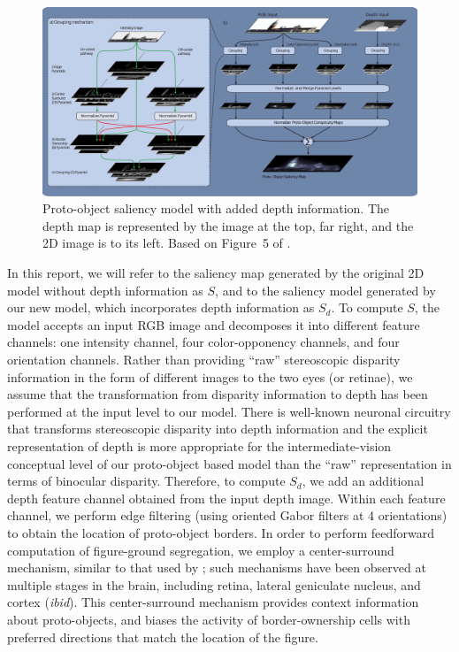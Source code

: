 \documentclass[12pt]{article}
\newcommand{\eg}[0]{{\em e.g.}\xspace}
\newcommand{\ibid}[0]{{\em ibid}\xspace}
\begin{document}
\begin{figure}%
\hfill
\begin{center}
\includegraphics[width=6in]{figs/DepthSaliency_new1.eps}
\end{center}
\caption{Proto-object saliency model with added depth information. The
  depth map is represented by the image at the top, far right, and the
  2D image is to its left. Based on Figure~5 of \cite{Russell_etal14}.}
\label{Fig:Model}
\end{figure}

In this report, we will refer to the saliency map generated by the
original 2D model without depth information as $S$, and to the
saliency model generated by our new model, which incorporates depth
information as $S_d$. To compute $S$, the model accepts an input RGB
image and decomposes it into different feature channels: one intensity
channel, four color-opponency channels, and four orientation channels.
Rather than providing ``raw'' stereoscopic disparity information in
the form of different images to the two eyes (or retinae), we assume
that the transformation from disparity information to depth has been
performed at the input level to our model. There is well-known
neuronal circuitry that transforms stereoscopic disparity into depth
information \cite[\eg][]{Poggio_Poggio84} and the explicit
representation of depth is more appropriate for the
intermediate-vision conceptual level of our proto-object based model
than the ``raw'' representation in terms of binocular disparity.
Therefore, to compute $S_d$, we add an additional depth feature
channel obtained from the input depth image. Within each feature
channel, we perform edge filtering (using oriented Gabor filters at 4
orientations) to obtain the location of proto-object borders. In order
to perform feedforward computation of figure-ground segregation, we
employ a center-surround mechanism, similar to that used by
\cite{Itti_etal98a}; such mechanisms have been observed at multiple
stages in the brain, including retina, lateral geniculate nucleus, and
cortex (\ibid). This center-surround mechanism provides context
information about proto-objects, and biases the activity of
border-ownership cells with preferred directions that match the
location of the figure.
\end{document}
